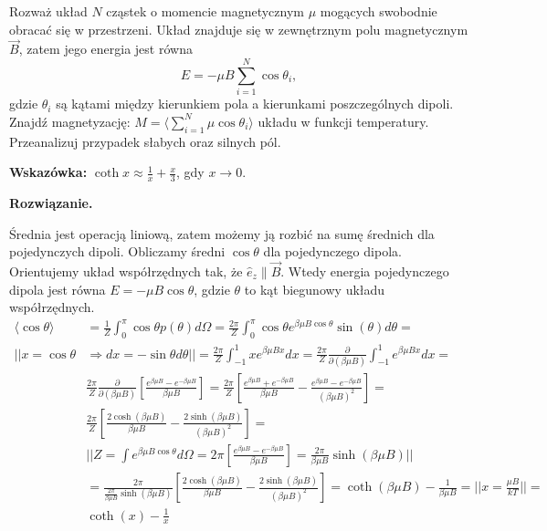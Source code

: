 \documentclass[11pt,a4paper]{article}
\newenvironment{solution}{\vspace{1cm} \par\textbf{Rozwiązanie.} \vspace{1cm}}{}
\begin{document}
Rozważ układ $N$ cząstek o momencie magnetycznym $\mu$ mogących swobodnie obracać się w przestrzeni. Układ
znajduje się w zewnętrznym polu magnetycznym $\vec{B}$, zatem jego energia jest równa
\[
E = -\mu B \sum_{i=1}^{N} \cos\theta_i,
\]
gdzie $\theta_i$ są kątami między kierunkiem pola a kierunkami poszczególnych dipoli.
 Znajdź magnetyzację: $M = \langle \sum_{i=1}^{N} \mu \cos\theta_i \rangle$
układu w funkcji temperatury. Przeanalizuj przypadek słabych oraz silnych pól. 

{\bf Wskazówka:} $\coth x \approx \frac{1}{x}+\frac{x}{3}$, gdy $x \to 0$.


\begin{solution}

Średnia jest operacją liniową, zatem możemy ją rozbić na sumę średnich dla 
pojedynczych dipoli. Obliczamy średni $\cos\theta$ dla pojedynczego dipola.
Orientujemy układ współrzędnych tak, że $\hat{e}_{z} \parallel \vec{B}$. 
Wtedy energia pojedynczego dipola jest równa $E = -\mu B \cos\theta$, gdzie 
$\theta$ to kąt biegunowy układu współrzędnych. 
\begin{align*}
  \langle \cos\theta \rangle &=  \frac{1}{Z} \int_{0}^{\pi} \cos\theta p(\theta) d\Omega =
  \frac{2\pi}{Z} \int_{0}^{\pi} \cos\theta e^{\beta \mu B \cos\theta} \sin(\theta)d\theta = \\
  || x = \cos\theta & \Rightarrow dx = -\sin\theta d\theta || 
   = \frac{2\pi}{Z} \int_{-1}^{1} x e^{\beta \mu B x} dx = 
   \frac{2\pi}{Z} \frac{\partial}{\partial (\beta \mu B)} \int_{-1}^{1} e^{\beta \mu B x} dx = \\
  & \frac{2\pi}{Z} \frac{\partial}{\partial (\beta \mu B)} \left[ \frac{e^{\beta \mu B} - e^{-\beta \mu B}}{\beta \mu B} \right] =
  \frac{2\pi}{Z} \left[ \frac{e^{\beta \mu B} + e^{-\beta \mu B}}{\beta \mu B} - \frac{e^{\beta \mu B} - e^{-\beta \mu B}}{(\beta \mu B)^2} \right] = \\
  & \frac{2\pi}{Z} \left[ \frac{2\cosh(\beta \mu B)}{\beta \mu B} - \frac{2\sinh(\beta \mu B)}{(\beta \mu B)^2} \right] = \\
  & || Z = \int e^{\beta \mu B \cos\theta} d\Omega = 2\pi \left[\frac{e^{\beta \mu B} - e^{-\beta \mu B}}{\beta \mu B} \right]  = \frac{2\pi}{\beta \mu B} \sinh(\beta \mu B) || \\
  & = \frac{2\pi}{\frac{2\pi}{\beta \mu B} \sinh(\beta \mu B)} \left[ \frac{2\cosh(\beta \mu B)}{\beta \mu B} - \frac{2\sinh(\beta \mu B)}{(\beta \mu B)^2} \right] =
  \coth(\beta \mu B) - \frac{1}{\beta \mu B} = || x = \frac{\mu B}{kT} ||  = \\
   & \coth(x) - \frac{1}{x}
\end{align*}


\end{solution}
\end{document}
